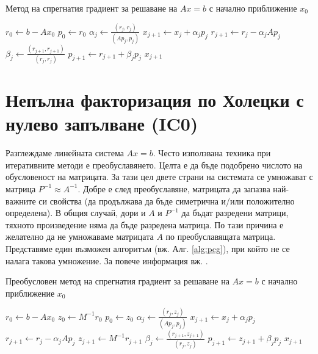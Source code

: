\documentclass[12pt]{report}
\begin{document}
\begin{algorithm}[H]
\centering
{}
\caption{Метод на спрегнатия градиент за решаване на $Ax=b$ с начално приближение $x_0$}\label{alg:CG}
\begin{algorithmic}[]
			\State $r_0 \gets b - Ax_0$
			\State $p_0 \gets r_0$
				\State $\alpha_j \gets \frac{(r_j, r_j)}{(Ap_j, p_j)}$
				\State $x_{j+1} \gets x_j + \alpha_j p_j$
				\State $r_{j+1} \gets r_j - \alpha_j Ap_j$
				\State $\beta_j \gets \frac{(r_{j+1}, r_{j+1})}{(r_j, r_j)}$
				\State $p_{j+1} \gets r_{j+1} + \beta_j p_j$
			\EndFor
			\State \Return $x_{j+1}$
		\EndProcedure
\end{algorithmic}
\end{algorithm}

\section{Непълна факторизация по Холецки с нулево запълване (IC0)}
Разглеждаме линейната система $Ax=b$. Често използвана техника при итеративните методи е преобуславянето. Целта е да бъде подобрено числото на обусловеност на матрицата. За тази цел двете страни на системата се умножават с матрица $P^{-1} \approx A^{-1}$. Добре е след преобуславяне, матрицата да запазва най-важните си свойства (да продължава да бъде симетрична и/или положително определена). В общия случай, дори и $A$ и $P^{-1}$ да бъдат разредени матрици, тяхното произведение няма да бъде разредена матрица. По тази причина е желателно да не умножаваме матрицата $A$ по преобуславящата матрица. Представяме един възможен алгоритъм (вж. Алг. \ref{alg:pcg}), при който не се налага такова умножение. За повече информация вж. \cite{saad-sparse}.

\begin{algorithm}[H]
\centering
{}
\caption{Преобусловен метод на спрегнатия градиент за решаване на $Ax=b$ с начално приближение $x_0$}\label{alg:pcg}
\begin{algorithmic}[1]
			\State $r_0 \gets b - Ax_0$
			\State $z_0 \gets M^{-1}r_0$\label{alg-line:apply-preconditioner}
			\State $p_0 \gets z_0$
				\State $\alpha_j \gets \frac{(r_j, z_j)}{(Ap_j, p_j)}$
				\State $x_{j+1} \gets x_j + \alpha_j p_j$
				\State $r_{j+1} \gets r_j - \alpha_j Ap_j$
				\State $z_{j+1} \gets M^{-1}r_{j+1}$
				\State $\beta_j \gets \frac{(r_{j+1}, z_{j+1})}{(r_j, z_j)}$
				\State $p_{j+1} \gets z_{j+1} + \beta_j p_j$
			\EndFor
			\State \Return $x_{j+1}$
		\EndProcedure
\end{algorithmic}
\end{algorithm}
\end{document}
